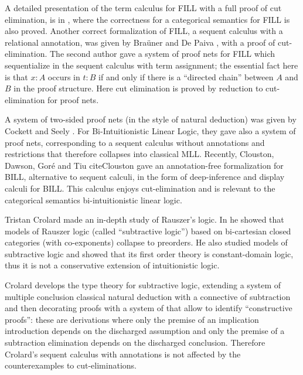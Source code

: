 A detailed presentation of the term calculus for FILL with a full
proof of cut elimination, is in \cite{EadesDePaiva2016}, where the
correctness for a categorical semantics for FILL is also proved.
Another correct formalization of FILL, a sequent calculus with a
relational annotation, was given by Bra\"uner and De Paiva
\cite{BraunedDePaiva:1997}, with a proof of cut-elimination.  The
second author \cite{Bellin1997} gave a system of proof nets for FILL
which sequentialize in the sequent calculus with term assignment; the
essential fact here is that $x:A$ occurs in $t:B$ if and only if there
is a ``directed chain'' between $A$ and $B$ in the proof
structure. Here cut elimination is proved by reduction to
cut-elimination for proof nets.


A system of two-sided proof nets (in the style of natural deduction)
was given by Cockett and Seely \cite{Cockett:1997}.  For
Bi-Intuitionistic Linear Logic, they gave also a system of proof nets,
corresponding to a sequent calculus without annotations and
restrictions that therefore collapses into classical MLL.  Recently,
Clouston, Dawson, Goré and Tiu cite{Clouston} gave an annotation-free
formalization for BILL, alternative to sequent calculi, in the form of
deep-inference and display calculi for BILL. This calculus enjoys
cut-elimination and is relevant to the categorical semantics
bi-intuitionistic linear logic.
 

Tristan Crolard \cite{Crolard:2001,Crolard:2004} made an in-depth
study of Rauszer's logic. In \cite{Crolard:2001} he showed that models
of Rauszer logic (called ``subtractive logic'') based on bi-cartesian
closed categories (with co-exponents) collapse to preorders.  He also
studied models of subtractive logic and showed that its first order
theory is constant-domain logic, thus it is not a conservative
extension of intuitionistic logic.

Crolard \cite{Crolard:2004} develops the type theory for subtractive
logic, extending a system of multiple conclusion classical natural
deduction with a connective of subtraction and then decorating proofs
with a system of \cite{annotationsofdependencies} that allow to
identify ``constructive proofs'': these are derivations where only the
premise of an implication introduction depends on the discharged
assumption and only the premise of a subtraction elimination depends
on the discharged conclusion. Therefore Crolard's sequent calculus
with annotations is not affected by the counterexamples to
cut-eliminations.

